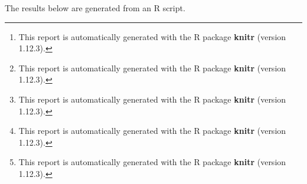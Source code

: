 \documentclass{article}\usepackage[]{graphicx}\usepackage[]{color}
\begin{document}
\title{\title{\title{\title{\title{\title{}}}}}}

\author{\author{\author{\author{\author{%
\thanks{This report is automatically generated with the R package \textbf{knitr}
        (version 1.12.3).}}%
\thanks{This report is automatically generated with the R package \textbf{knitr}
        (version 1.12.3).}}%
\thanks{This report is automatically generated with the R package \textbf{knitr}
        (version 1.12.3).}}%
\thanks{This report is automatically generated with the R package \textbf{knitr}
        (version 1.12.3).}}%
\thanks{This report is automatically generated with the R package \textbf{knitr}
        (version 1.12.3).}}

\maketitle
The results below are generated from an R script.
\end{document}

